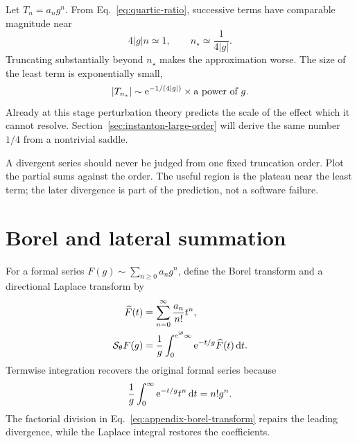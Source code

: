Let $T_n=a_ng^n$.  From Eq.~\eqref{eq:quartic-ratio}, successive terms have
comparable magnitude near
\begin{equation}
  4|g|n\simeq 1,
  \qquad
  n_\star\simeq \frac{1}{4|g|}.
  \label{eq:least-term-order}
\end{equation}
Truncating substantially beyond $n_\star$ makes the approximation worse.
The size of the least term is exponentially small,
\begin{equation}
  |T_{n_\star}|\sim
  \mathrm{e}^{-1/(4|g|)}\times \text{a power of }g.
  \label{eq:least-term-scale}
\end{equation}
Already at this stage perturbation theory predicts the scale of the effect
which it cannot resolve.  Section~\ref{sec:instanton-large-order} will derive
the same number $1/4$ from a nontrivial saddle.

\begin{checkpointbox}
A divergent series should never be judged from one fixed truncation order.
Plot the partial sums against the order.  The useful region is the plateau
near the least term; the later divergence is part of the prediction, not a
software failure.
\end{checkpointbox}

\section{Borel and lateral summation}
\label{sec:borel-lateral-appendix}

For a formal series $F(g)\sim\sum_{n\geq0}a_ng^n$, define the Borel transform
and a directional Laplace transform by
\begin{align}
  \widehat F(t)
  &=\sum_{n=0}^{\infty}\frac{a_n}{n!}t^n,
  \label{eq:appendix-borel-transform}\\
  \mathcal S_\theta F(g)
  &=\frac{1}{g}\int_{0}^{\mathrm{e}^{\mathrm{i}\theta}\infty}
    \mathrm{e}^{-t/g}\widehat F(t)\,\mathrm{d} t.
  \label{eq:appendix-borel-laplace}
\end{align}
Termwise integration recovers the original formal series because
\begin{equation}
  \frac{1}{g}\int_0^\infty \mathrm{e}^{-t/g}t^n\,\mathrm{d} t=n!g^n.
  \label{eq:borel-inverse-check}
\end{equation}
The factorial division in Eq.~\eqref{eq:appendix-borel-transform} repairs the
leading divergence, while the Laplace integral restores the coefficients.

